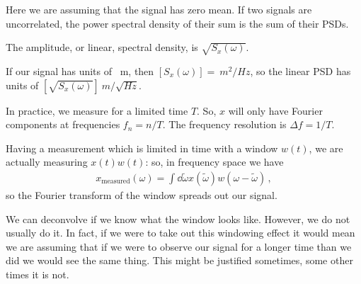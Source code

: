 \documentclass[main.tex]{subfiles}
\begin{document}
Here we are assuming that the signal has zero mean.
If two signals are uncorrelated, the power spectral density of their sum is the sum of their PSDs. 

The amplitude, or linear, spectral density, is \(\sqrt{S_x(\omega )}\). 

If our signal has units of \SI{}{m}, then \([S_x(\omega )] = \SI{}{m^2/Hz}\), so the linear PSD has units of \([\sqrt{S_x(\omega )}] \SI{}{m / \sqrt{Hz}}\).

In practice, we measure for a limited time \(T\). So, \(x\) will only have Fourier components at frequencies \(f_n = n / T\). The frequency resolution is \(\Delta f = 1 / T\). 

Having a measurement which is limited in time with a window \(w(t)\), we are actually measuring \(x(t) w(t)\): so, in frequency space we have 
%
\begin{align}
x _{\text{measured}} (\omega ) = \int \dd{\widetilde{\omega}} x(\widetilde{\omega}) w(\omega - \widetilde{\omega} ) 
\,,
\end{align}
%
so the Fourier transform of the window spreads out our signal.

We can deconvolve if we know what the window looks like. However, we do not usually do it. 
In fact, if we were to take out this windowing effect it would mean we are assuming that if we were to observe our signal for a longer time than we did we would see the same thing.
This might be justified sometimes, some other times it is not.
\end{document}
